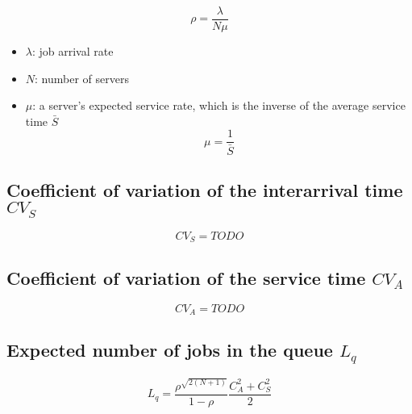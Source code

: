 \documentclass[11pt]{article}
\begin{document}
\begin{equation}
    \rho = \frac{\lambda}{N \mu}
\end{equation}

\begin{itemize}
    \item $\lambda$: job arrival rate
    \item $N$: number of servers
    \item $\mu$: a server's expected service rate, which is the inverse of the average service time $\bar{S}$ \begin{equation}
        \mu = \frac{1}{\bar{S}}
    \end{equation}
\end{itemize}

\subsection{Coefficient of variation of the interarrival time $CV_S$}

\begin{equation}
    CV_S = TODO
\end{equation}

\subsection{Coefficient of variation of the service time $CV_A$}

\begin{equation}
    CV_A = TODO
\end{equation}

\subsection{Expected number of jobs in the queue $L_q$}

\begin{equation}
    L_q = \frac{\rho^{\sqrt{2(N + 1)}}}{1 - \rho} \frac{C_A^2 + C_S^2}{2}
\end{equation}
\end{document}
